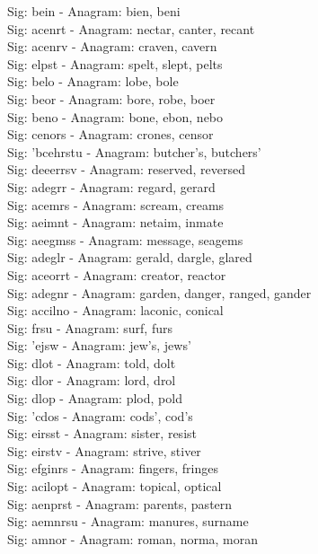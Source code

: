 Sig: {bein} - Anagram: bien, beni \\
Sig: {acenrt} - Anagram: nectar, canter, recant \\
Sig: {acenrv} - Anagram: craven, cavern \\
Sig: {elpst} - Anagram: spelt, slept, pelts \\
Sig: {belo} - Anagram: lobe, bole \\
Sig: {beor} - Anagram: bore, robe, boer \\
Sig: {beno} - Anagram: bone, ebon, nebo \\
Sig: {cenors} - Anagram: crones, censor \\
Sig: {'bcehrstu} - Anagram: butcher's, butchers' \\
Sig: {deeerrsv} - Anagram: reserved, reversed \\
Sig: {adegrr} - Anagram: regard, gerard \\
Sig: {acemrs} - Anagram: scream, creams \\
Sig: {aeimnt} - Anagram: netaim, inmate \\
Sig: {aeegmss} - Anagram: message, seagems \\
Sig: {adeglr} - Anagram: gerald, dargle, glared \\
Sig: {aceorrt} - Anagram: creator, reactor \\
Sig: {adegnr} - Anagram: garden, danger, ranged, gander \\
Sig: {accilno} - Anagram: laconic, conical \\
Sig: {frsu} - Anagram: surf, furs \\
Sig: {'ejsw} - Anagram: jew's, jews' \\
Sig: {dlot} - Anagram: told, dolt \\
Sig: {dlor} - Anagram: lord, drol \\
Sig: {dlop} - Anagram: plod, pold \\
Sig: {'cdos} - Anagram: cods', cod's \\
Sig: {eirsst} - Anagram: sister, resist \\
Sig: {eirstv} - Anagram: strive, stiver \\
Sig: {efginrs} - Anagram: fingers, fringes \\
Sig: {acilopt} - Anagram: topical, optical \\
Sig: {aenprst} - Anagram: parents, pastern \\
Sig: {aemnrsu} - Anagram: manures, surname \\
Sig: {amnor} - Anagram: roman, norma, moran \\
